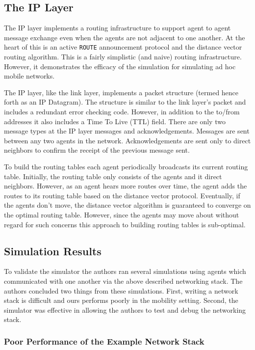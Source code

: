 \subsection{The IP Layer}

The IP layer implements a routing infrastructure to support agent to agent message exchange even
when the agents are not adjacent to one another. At the heart of this is an active \texttt{ROUTE}
announcement protocol and the distance vector routing algorithm. This is a fairly simplistic (and
naive) routing infrastructure. However, it demonstrates the efficacy of the simulation for
simulating ad hoc mobile networks.

The IP layer, like the link layer, implements a packet structure (termed hence forth as an IP
Datagram). The structure is similar to the link layer's packet and includes a redundant error
checking code. However, in addition to the to/from addresses it also includes a Time To Live (TTL)
field. There are only two message types at the IP layer messages and acknowledgements. Messages are
sent between any two agents in the network. Acknowledgements are sent only to direct neighbors to
confirm the receipt of the previous message sent. 

To build the routing tables each agent periodically broadcasts its current routing table. Initially,
the routing table only consists of the agents and it direct neighbors. However, as an agent hears
more routes over time, the agent adds the routes to its routing table based on the distance vector
protocol. Eventually, if the agents don't move, the distance vector algorithm is guaranteed to
converge on the optimal routing table. However, since the agents may move about without regard for
such concerns this approach to building routing tables is sub-optimal.

\subsection{Simulation Results}

To validate the simulator the authors ran several simulations using agents which communicated with
one another via the above described networking stack. The authors concluded two things from these
simulations. First, writing a network stack is difficult and ours performs poorly in the mobility
setting. Second, the simulator was effective in allowing the authors to test and debug the
networking stack.

\subsubsection{Poor Performance of the Example Network Stack}

